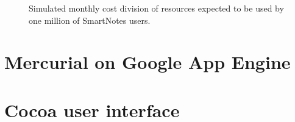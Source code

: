\begin{figure}[ht]
  \begin{center}
  \end{center}
  \caption{Simulated monthly cost division of resources expected to be used by one million of SmartNotes users.}
  \label{fig:gae_cost}
\end{figure}


\section{Mercurial on Google App Engine}\label{sec:hg_on_gae}
\section{Cocoa user interface}\label{sec:cocoa}